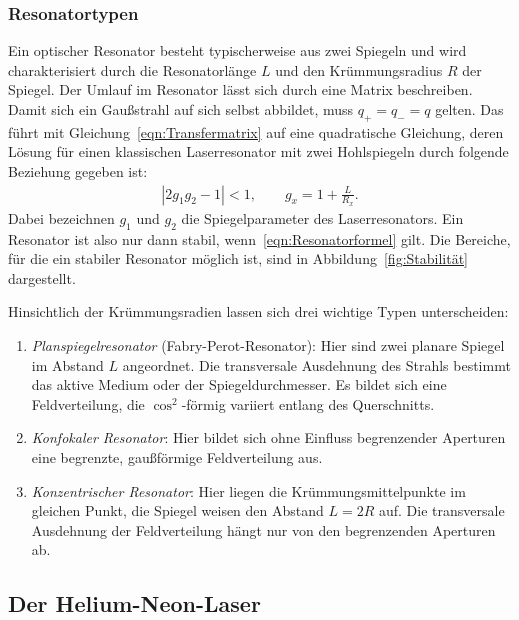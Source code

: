 \documentclass[a4paper,twoside,final]{article}
\begin{document}
\subsubsection{Resonatortypen}
Ein optischer Resonator besteht typischerweise aus zwei Spiegeln und wird charakterisiert durch die Resonatorlänge $L$ und den Krümmungsradius $R$ der Spiegel. Der Umlauf im Resonator lässt sich durch eine Matrix beschreiben. Damit sich ein Gaußstrahl auf sich selbst abbildet, muss $q_+ = q_- = q$ gelten. Das führt mit Gleichung~\eqref{eqn:Transfermatrix} auf eine quadratische Gleichung, deren Lösung für einen klassischen Laserresonator mit zwei Hohlspiegeln durch folgende Beziehung gegeben ist:
\begin{align}\label{eqn:Resonatorformel}
  |2g_1 g_2 -1 | < 1, \qquad g_x = 1 + \frac{L}{R_x}.
\end{align}
Dabei bezeichnen $g_1$ und $g_2$ die Spiegelparameter des Laserresonators. Ein Resonator ist also nur dann stabil, wenn~\eqref{eqn:Resonatorformel} gilt. Die Bereiche, für die ein stabiler Resonator möglich ist, sind in Abbildung~\ref{fig:Stabilität} dargestellt.



Hinsichtlich der Krümmungsradien lassen sich drei wichtige Typen unterscheiden:

\begin{enumerate}[label=\Alph*)]
  \item \emph{Planspiegelresonator} (Fabry-Perot-Resonator): Hier sind zwei planare Spiegel im Abstand $L$ angeordnet. Die transversale Ausdehnung des Strahls bestimmt das aktive Medium oder der Spiegeldurchmesser. Es bildet sich eine Feldverteilung, die $\cos^2$-förmig variiert entlang des Querschnitts.
  \item \emph{Konfokaler Resonator}: Hier bildet sich ohne Einfluss begrenzender Aperturen eine begrenzte, gaußförmige Feldverteilung aus.
  \item \emph{Konzentrischer Resonator}: Hier liegen die Krümmungsmittelpunkte im gleichen Punkt, die Spiegel weisen den Abstand $L=2R$ auf. Die transversale Ausdehnung der Feldverteilung hängt nur von den begrenzenden Aperturen ab.
\end{enumerate}
\subsection{Der Helium-Neon-Laser}



\newpage
\end{document}

